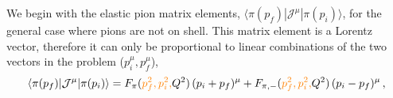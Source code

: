  We begin with the elastic pion matrix elements, $\langle\pi(p_f)|{\mathcal{J}}^{\mu}|\pi(p_i)\rangle$, for the general case where pions are not on shell. This matrix element is a Lorentz vector, therefore it can only be proportional to linear combinations of the two vectors in the problem ($p_i^\mu, p_f^\mu$),
	\begin{align}
	\langle\pi(p_f)|{\mathcal{J}}^{\mu}|\pi(p_i)\rangle=F_\pi({\color{orange} p_f^2,p_i^2,}Q^2)\,(p_i+p_f)^\mu+F_{\pi,-}({\color{orange} p_f^2,p_i^2,}Q^2)\,(p_i-p_f)^\mu\, ,
	\end{align}

